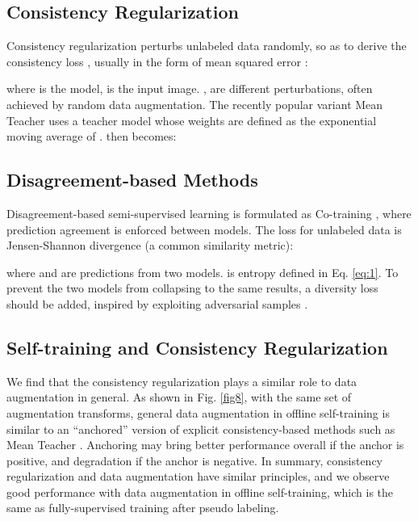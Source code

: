 \documentclass[preprint,review,10pt]{elsarticle}
\begin{document}
\subsection{Consistency Regularization}

Consistency regularization perturbs unlabeled data randomly, so as to derive the consistency loss , usually in the form of mean squared error \cite{laine2017temporal}:


where  is the model,  is the input image. ,  are different perturbations, often achieved by random data augmentation. The recently popular variant Mean Teacher \cite{tarvainen2017mean} uses a teacher model  whose weights are defined as the exponential moving average of .  then becomes:



\subsection{Disagreement-based Methods}

Disagreement-based semi-supervised learning is formulated as Co-training \cite{qiao2018deep}, where prediction agreement is enforced between models. The loss for unlabeled data is Jensen-Shannon divergence (a common similarity metric):


where  and  are predictions from two models.  is entropy defined in Eq. \ref{eq:1}. To prevent the two models from collapsing to the same results, a diversity loss should be added, inspired by exploiting adversarial samples  \cite{peng2020deep}.

\subsection{Self-training and Consistency Regularization}
\label{sec:22}
We find that the consistency regularization plays a similar role to data augmentation in general. As shown in Fig. \ref{fig8}, with the same set of augmentation transforms, general data augmentation in offline self-training is similar to an ``anchored'' version of explicit consistency-based methods such as Mean Teacher \cite{tarvainen2017mean}. Anchoring may bring better performance overall if the anchor is positive, and degradation if the anchor is negative. In summary, consistency regularization and data augmentation have similar principles, and we observe good performance with data augmentation in offline self-training, which is the same as fully-supervised training after pseudo labeling.
\end{document}
